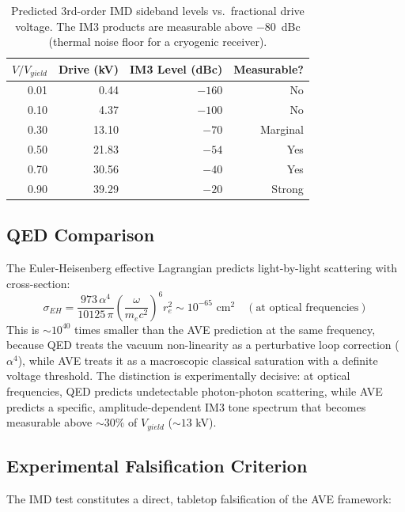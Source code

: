 \begin{table}[H]
\centering
\caption{Predicted 3rd-order IMD sideband levels vs.\ fractional drive voltage. The IM3 products are measurable above $-80$~dBc (thermal noise floor for a cryogenic receiver).}
\label{tab:imd_levels}
\small
\begin{tabular}{@{}r r r r@{}}
\toprule
$V/V_{yield}$ & Drive (kV) & IM3 Level (dBc) & Measurable? \\
\midrule
0.01 & 0.44  & $-160$ & No  \\
0.10 & 4.37  & $-100$ & No  \\
0.30 & 13.10 & $-70$  & Marginal \\
0.50 & 21.83 & $-54$  & Yes \\
0.70 & 30.56 & $-40$  & Yes \\
0.90 & 39.29 & $-20$  & Strong \\
\bottomrule
\end{tabular}
\end{table}

\subsection{QED Comparison}

The Euler-Heisenberg effective Lagrangian predicts light-by-light scattering with cross-section:
\begin{equation}
    \sigma_{EH} = \frac{973\, \alpha^4}{10125\, \pi} \left(\frac{\omega}{m_e c^2}\right)^{\!6} r_e^2 \sim 10^{-65} \text{ cm}^2 \quad (\text{at optical frequencies})
\end{equation}
This is $\sim 10^{40}$ times smaller than the AVE prediction at the same frequency, because QED treats the vacuum non-linearity as a perturbative loop correction ($\alpha^4$), while AVE treats it as a macroscopic classical saturation with a definite voltage threshold. The distinction is experimentally decisive: at optical frequencies, QED predicts undetectable photon-photon scattering, while AVE predicts a specific, amplitude-dependent IM3 tone spectrum that becomes measurable above $\sim 30\%$ of $V_{yield}$ ($\sim 13$ kV).

\subsection{Experimental Falsification Criterion}

The IMD test constitutes a direct, tabletop falsification of the AVE framework:

